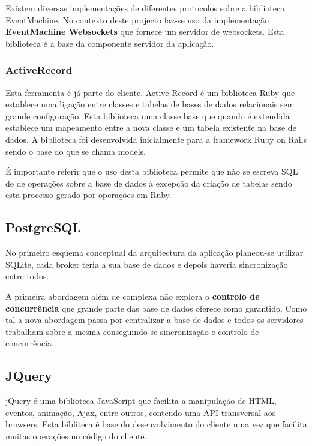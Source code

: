 Existem diversas implementações de diferentes protocolos sobre a biblioteca EventMachine. No contexto deste projecto faz-se uso da implementação \textbf{EventMachine Websockets} que fornece um servidor de websockets. Esta biblioteca é a base da componente servidor da aplicação. 

\subsubsection{ActiveRecord}
Esta ferramenta é já parte do cliente.
Active Record é um biblioteca Ruby que establece uma ligação entre classes e tabelas de bases de dados relacionais sem grande configuração. Esta biblioteca uma classe base que quando é extendida establece um mapeamento entre a nova classe e um tabela existente na base de dados. A biblioteca foi desenvolvida inicialmente para a framework Ruby on Rails sendo o base do que se chama models.

É importante referir que o uso desta biblioteca permite que não se escreva SQL de de operações sobre a base de dados à excepção da criação de tabelas sendo esta processo gerado por operações em Ruby.

\subsection{PostgreSQL}

No primeiro esquema conceptual da arquitectura da aplicação planeou-se utilizar SQLite, cada broker teria a sua base de dados e depois haveria sincronização entre todos. 

A primeira abordagem além de complexa não explora o \textbf{controlo de concurrência} que grande parte das base de dados oferece como garantido. Como tal a nova abordagem passa por centralizar a base de dados e todos os servidores trabalham sobre a mesma conseguindo-se sincronização e controlo de concurrência.

\subsection{JQuery}

jQuery é uma biblioteca JavaScript que facilita a manipulação de HTML, eventos, animação, Ajax, entre outros, contendo uma API transversal aos browsers.
Esta bibliteca é base do desenvolvimento do cliente uma vez que facilita muitas operações no código do cliente.


